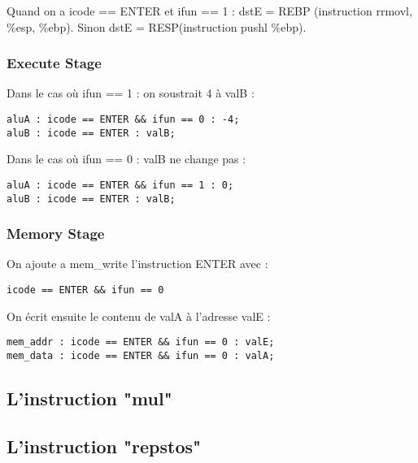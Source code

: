 \documentclass[12pt]{article}
\begin{document}
Quand on a icode == ENTER et ifun == 1 : dstE = REBP (instruction rrmovl, \%esp, \%ebp). Sinon dstE = RESP(instruction pushl \%ebp).

\subsubsection{Execute Stage}
Dans le cas où ifun == 1 : on soustrait 4 à valB :
\begin{verbatim}
aluA : icode == ENTER && ifun == 0 : -4;
aluB : icode == ENTER : valB;
\end{verbatim}

Dans le cas où ifun == 0 : valB ne change pas :
\begin{verbatim}
aluA : icode == ENTER && ifun == 1 : 0;
aluB : icode == ENTER : valB;
\end{verbatim}

\subsubsection{Memory Stage}
On ajoute a mem\_write l'instruction ENTER avec :
\begin{verbatim}
icode == ENTER && ifun == 0
\end{verbatim}

On écrit ensuite le contenu de valA à l'adresse valE :
\begin{verbatim}
mem_addr : icode == ENTER && ifun == 0 : valE;
mem_data : icode == ENTER && ifun == 0 : valA;
\end{verbatim}

\subsection{L'instruction "mul"}

\subsection{L'instruction "repstos"}
\end{document}
